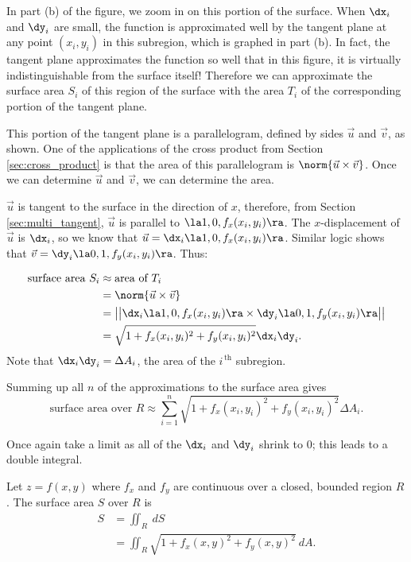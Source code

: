In part (b) of the figure, we zoom in on this portion of the surface. When $\dx_i$ and $\dy_i$ are small, the function is approximated well by the tangent plane at any point $(x_i,y_i)$ in this subregion, which is graphed in part (b). In fact, the tangent plane approximates the function so well that in this figure, it is virtually indistinguishable from the surface itself! Therefore we can approximate the surface area $S_i$ of this region of the surface with the area $T_i$ of the corresponding portion of the tangent plane.

This portion of the tangent plane is a parallelogram, defined by sides $\vec u$ and $\vec v$, as shown. One of the applications of the cross product from Section \ref{sec:cross_product} is that the area of this parallelogram is $\norm{\vec u\times \vec v}$. Once we can determine $\vec u$ and $\vec v$, we can determine the area.

$\vec u$ is tangent to the surface in the direction of $x$, therefore, from Section \ref{sec:multi_tangent}, $\vec u$ is parallel to $\la 1,0,f_x(x_i,y_i)\ra$. The $x$-displacement of $\vec u$ is $\dx_i$, so we know that $\vec u = \dx_i\la 1,0,f_x(x_i,y_i)\ra$. Similar logic shows that $\vec v = \dy_i\la 0,1,f_y(x_i,y_i)\ra$. Thus:

\begin{align*}
\text{surface area $S_i$} &\approx \text{area of  $T_i$}\\
				&= \norm{\vec u\times \vec v}\\
				&= \big|\big|\dx_i\la 1,0,f_x(x_i,y_i)\ra\times\dy_i\la 0,1,f_y(x_i,y_i)\ra\big|\big|\\
				&=\sqrt{1+f_x(x_i,y_i)^2+f_y(x_i,y_i)^2}\dx_i\dy_i.
\end{align*}
Note that $\dx_i\dy_i = \Delta A_i$, the area of the $i^{\,\text{th}}$ subregion.

Summing up all $n$ of the approximations to the surface area gives
$$\text{surface area over $R$} \approx \sum_{i=1}^n \sqrt{1+f_x(x_i,y_i)^2+f_y(x_i,y_i)^2}\Delta A_i.$$

Once again take a limit as all of the $\dx_i$ and $\dy_i$ shrink to 0; this leads to a double integral.

{Let $z=f(x,y)$ where $f_x$ and $f_y$ are continuous over a closed, bounded region $R$. The surface area $S$ over $R$ is 
\begin{align*}
S &= \iint_R \ dS\\
&=\iint_R \sqrt{1+f_x(x,y)^2+f_y(x,y)^2}\ dA.
\end{align*}
}


